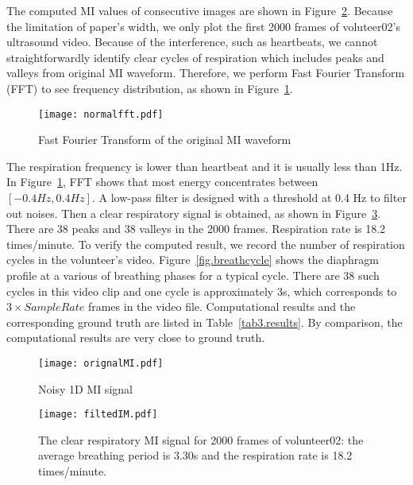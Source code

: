 The computed MI values of consecutive images are shown in Figure~\ref{fig.orignalMI}. Because the limitation of paper's width, we only plot the first 2000 frames of voluteer02's ultrasound video. Because of the interference, such as heartbeats, we cannot straightforwardly identify clear cycles of respiration which includes peaks and valleys from original MI waveform. Therefore, we perform Fast Fourier Transform (FFT) to see frequency distribution, as shown in Figure~\ref{fig.fft}.
\begin{figure}[h!]
\centering
\texttt{[image: normalfft.pdf]}
\caption{Fast Fourier Transform of the original MI waveform}
\label{fig.fft}
\end{figure}
The respiration frequency is lower than heartbeat and it is usually less than 1Hz. In Figure~\ref{fig.fft}, FFT shows that most energy concentrates between $[-0.4 Hz, 0.4 Hz]$. A low-pass filter is designed with a threshold at 0.4 Hz to filter out noises. Then a clear respiratory signal is obtained, as shown in Figure~\ref{fig.filteredMI}. There are 38 peaks and 38 valleys in the 2000 frames. Respiration rate is 18.2 times/minute. To verify the computed result, we record the number of respiration cycles in the volunteer's video. Figure~\ref{fig.breathcycle} shows the diaphragm profile at a various of breathing phases for a typical cycle. There are 38 such cycles in this video clip and one cycle is approximately 3s, which corresponds to $3\times Sample Rate$ frames in the video file. Computational results and the corresponding ground truth are listed in Table~\ref{tab3.results}. By comparison, the computational results are very close to ground truth.

\begin{figure}[h!]
\centering
\texttt{[image: orignalMI.pdf]}
\caption{Noisy 1D MI signal}
\label{fig.orignalMI}
\end{figure}

\begin{figure}[h!]
\centering
\texttt{[image: filtedIM.pdf]}
\caption{The clear respiratory MI signal for 2000 frames of volunteer02: the average breathing period is 3.30s and the respiration rate is 18.2 times/minute.}
\label{fig.filteredMI}
\end{figure}

